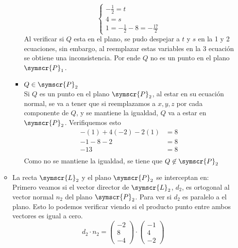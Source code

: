 \documentclass{article}
\def\fancyL{\symscr{L}}
\def\fancyP{\symscr{P}}
\begin{document}
\begin{enumerate}
\begin{itemize}
\begin{itemize}
\[\begin{cases}
                            -\frac{1}{2} = t \\
                            4 = s \\
                            1 = -\frac{1}{2} - 8 = -\frac{17}{2}
                        \end{cases}
                    \]
                    Al verificar si \(Q\) esta en el plano, se pudo despejar a \(t\) y \(s\) en la 1 y 2 ecuaciones, sin embargo, 
                    al reemplazar estas variables en la 3 ecuación se obtiene una inconsistencia.
                    Por ende \(Q\) no es un punto en el plano \(\fancyP_1\).
                \item \(Q \in \fancyP_2\) \\
                    Si \(Q\) es un punto en el plano \(\fancyP_2\), al estar en su ecuación normal, se va a tener que si reemplazamos a \(x, y, z\) por 
                    cada componente de \(Q\), y se mantiene la igualdad, \(Q\) va a estar en \(\fancyP_2\). Verifiquemos esto
                    \[
                        \begin{aligned}
                            -(1) + 4(-2) -2(1) &= 8 \\
                            -1 -8 -2 &= 8 \\
                            -13 &= 8 \\
                        \end{aligned}
                    \]
                    Como no se mantiene la igualdad, se tiene que \(Q \not\in \fancyP_2\)
            \end{itemize}
        \item La recta \(\fancyL_2\) y el plano \(\fancyP_2\) se interceptan en: \\
            Primero veamos si el vector director de \(\fancyL_2\), \(d_2\), es ortogonal al vector normal \(n_2\) del plano \(\fancyP_2\).
            Para ver si \(d_2\) es paralelo a el plano. Esto lo podemos verificar viendo si el producto punto entre ambos vectores es igual a cero.
            \[
                d_2 \cdot n_2 =
                \begin{pmatrix}
                    -2 \\ 8 \\ -4
                \end{pmatrix}
                \cdot
                \begin{pmatrix}
                    -1 \\ 4 \\ -2

\end{pmatrix}\]
\end{itemize}
\end{enumerate}
\end{document}

